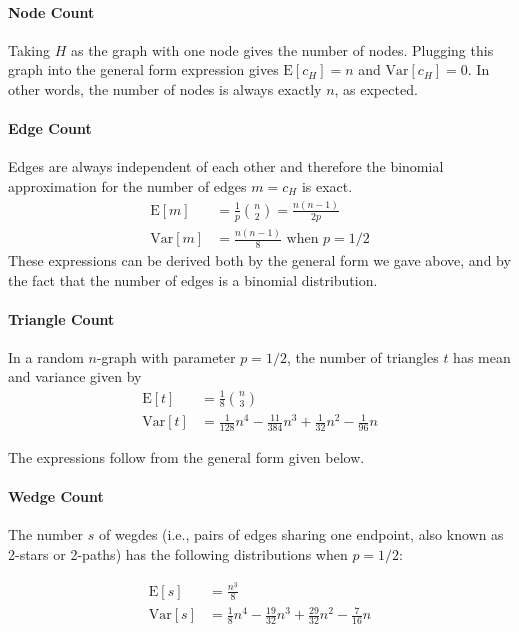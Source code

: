 \documentclass{article}
\begin{document}
\paragraph{Node Count}
Taking $H$ as the graph with one node gives the number of
nodes. Plugging this graph into the general form expression gives
$\mathrm{E}[c_H]=n$ and $\mathrm{Var}[c_H] = 0$.  In other words, the
number of nodes is always exactly $n$, as expected. 

\paragraph{Edge Count}
Edges are always independent of each other and therefore the binomial
approximation for the number of edges $m = c_H$ is exact.
\begin{align*}
  \mathrm{E}[m] &= \frac 1p {n \choose 2} = \frac{n(n-1)}{2p} \\
  \mathrm{Var}[m] &= \frac{n(n-1)}{8} \text{ when $p=1/2$}
\end{align*}
These expressions can be derived both by the general form we gave above,
and by the fact that the number of edges is a binomial distribution. 

\paragraph{Triangle Count}
In a random $n$-graph with parameter $p=1/2$, the number of triangles $t$
has mean and variance given by
\begin{align*}
  \mathrm{E}[t] &= \frac 18 {n \choose 3} \\
  \mathrm{Var}[t] &=
  \frac 1 {128} n^4 - \frac{11}{384}n^3 + \frac 1 {32} n^2 - \frac 1{96} n
\end{align*}

The expressions follow from the general form given below. 

\paragraph{Wedge Count}
The number $s$ of wegdes (i.e., pairs of edges sharing one endpoint,
also known as 2-stars or 2-paths) has
the following distributions when $p=1/2$:

\begin{align*}
  \mathrm{E}[s] &= \frac{n^{\underline{3}}}{8} \\
  \mathrm{Var}[s] &= \frac 18 n^4 - \frac{19}{32}n^3 + \frac {29}{32}n^2
  - \frac{7}{16}n
\end{align*}
\end{document}
